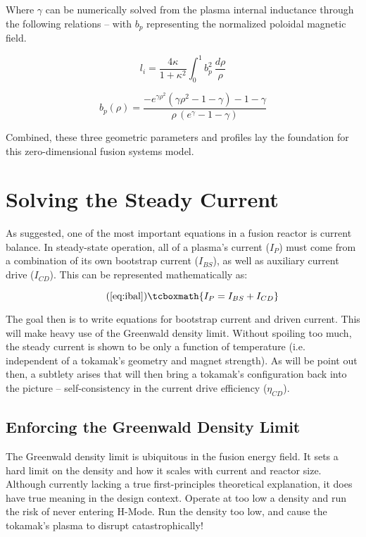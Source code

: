 Where $\gamma$ can be numerically solved from the plasma internal inductance through the following relations -- with $b_p$ representing the normalized poloidal magnetic field.

\begin{equation}
	l_i = \frac{4 \kappa}{1+\kappa^2}	 \int_0^1 b_p^2 \ \frac{d\rho}{\rho}
\end{equation}

\begin{equation}
	\label{eq:b_p}
	b_p(\rho) = \frac{ -e^{\gamma\rho^2} ( \gamma\rho^2 - 1 - \gamma ) - 1 - \gamma }{\rho \,( e^\gamma - 1 - \gamma ) }
\end{equation}

Combined, these three geometric parameters and profiles lay the foundation for this zero-dimensional fusion systems model.

\section{Solving the Steady Current}

As suggested, one of the most important equations in a fusion reactor is current balance. In steady-state operation, all of a plasma's current ($I_P$) must come from a combination of its own bootstrap current ($I_{BS}$), as well as auxiliary current drive ($I_{CD}$). This can be represented mathematically as:

\begin{equation}
	\tag{\ref{eq:ibal}}
	\tcboxmath{
	I_P = I_{BS} + I_{CD}
	}
\end{equation}

The goal then is to write equations for bootstrap current and driven current. This will make heavy use of the Greenwald density limit. Without spoiling too much, the steady current is shown to be only a function of temperature (i.e. independent of a tokamak's geometry and magnet strength). As will be point out then, a subtlety arises that will then bring a tokamak's configuration back into the picture -- self-consistency in the current drive efficiency ($\eta_{CD}$).

\subsection{Enforcing the Greenwald Density Limit}

The Greenwald density limit is ubiquitous in the fusion energy field. It sets a hard limit on the density and how it scales with current and reactor size. Although currently lacking a true first-principles theoretical explanation, it does have true meaning in the design context. Operate at too low a density and run the risk of never entering H-Mode. Run the density too low, and cause the tokamak's plasma to disrupt catastrophically!

